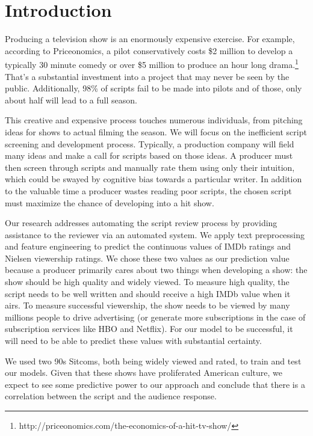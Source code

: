 \documentclass{sig-alternate-05-2015}
\begin{document}
\section{Introduction}
Producing a television show is an enormously expensive exercise. For example, according to Priceonomics, a pilot conservatively costs \$2 million to develop a typically 30 minute comedy or over \$5 million to produce an hour long drama.\footnote{http://priceonomics.com/the-economics-of-a-hit-tv-show/} That's a substantial investment into a project that may never be seen by the public. Additionally, 98\% of scripts fail to be made into pilots and of those, only about half will lead to a full season.

This creative and expensive process touches numerous individuals, from pitching ideas for shows to actual filming the season. We will focus on the inefficient script screening and development process. Typically, a production company will field many ideas and make a call for scripts based on those ideas. A producer must then screen through scripts and manually rate them using only their intuition, which could be swayed by cognitive bias towards a particular writer. In addition to the valuable time a producer wastes reading poor scripts, the chosen script must maximize the chance of developing into a hit show. 

Our research addresses automating the script review process by providing assistance to the reviewer via an automated system. We apply text preprocessing and feature engineering to predict the continuous values of IMDb ratings and Nielsen viewership ratings. We chose these two values as our prediction value because a producer primarily cares about two things when developing a show: the show should be high quality and widely viewed. To measure high quality, the script needs to be well written and should receive a high IMDb value when it airs. To measure successful viewership, the show needs to be viewed by many millions people to drive advertising (or generate more subscriptions in the case of subscription services like HBO and Netflix). For our model to be successful, it will need to be able to predict these values with substantial certainty.

We used two 90s Sitcoms, both being widely viewed and rated, to train and test our models. Given that these shows have proliferated American culture, we expect to see some predictive power to our approach and conclude that there is a correlation between the script and the audience response.
\end{document}

